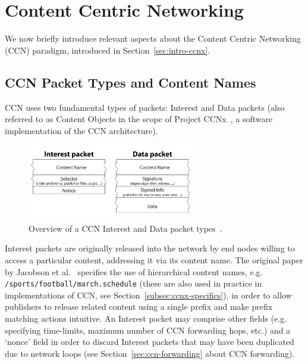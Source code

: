 \chapter{Content Centric Networking}
\label{chap:ccn}

We now briefly introduce relevant aspects about the Content Centric Networking 
(CCN) paradigm, introduced in Section~\ref{sec:intro-ccnx}.

\section{CCN Packet Types and Content Names}
\label{sec:ccn-packets}

CCN uses two fundamental types of packets: Interest and Data packets (also 
referred to as Content Objects in the scope of Project CCNx~\cite{website:ccnx}, 
a software implementation of the CCN architecture).\vertbreak

\begin{figure}[h!]

    \centering
    \includegraphics[width=0.65\textwidth]{figures/ccn-packets.png}
    \cprotect\caption{Overview of a CCN Interest and Data packet 
        types~\cite{Jacobson2009}.}
    \label{fig:ccnx-packets}

\end{figure}

Interest packets are originally released into the network by end nodes willing to access a 
particular content, addressing it via its content name. The original paper by 
Jacobson et al.~\cite{Jacobson2009} specifies the use of hierarchical content names, 
e.g. \verb+/sports/football/march.schedule+ (these are also used in practice 
in implementations of CCN, see Section~\ref{subsec:ccnx-specifics}), in order 
to allow publishers to release related content using a single 
prefix and make prefix matching actions intuitive. An Interest packet may 
comprise other fields (e.g. specifying time-limits, maximum number of CCN 
forwarding hops, etc.) and a `nonce' field in order to discard Interest packets 
that may have been duplicated due to network loops (see 
Section~\ref{sec:ccn-forwarding} about CCN forwarding).\vertbreak

